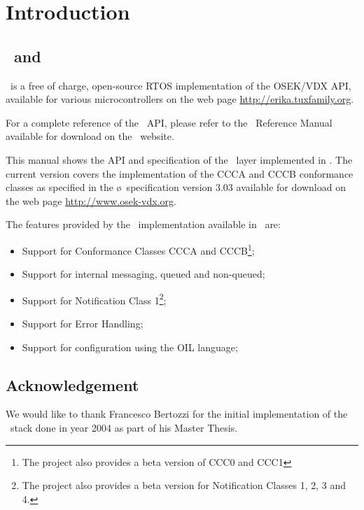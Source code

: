 \chapter{Introduction}

\section{\ee\ and \oc}

\ee\ is a free of charge, open-source RTOS implementation of the
OSEK/VDX API, available for various microcontrollers on the web page
\url{http://erika.tuxfamily.org}.

For a complete reference of the \ee\ API, please refer to the
\ee\ Reference Manual available for download on the \ee\ website.

This manual shows the API and specification of the \oc\ layer
implemented in \ee. The current version covers the
implementation of the CCCA and CCCB conformance classes as specified
in the \o\ specification version 3.03 available for download on
the web page \url{http://www.osek-vdx.org}.

The features provided by the \oc\ implementation available in \ee\ are:

\begin{itemize}
\item Support for Conformance Classes CCCA and CCCB\footnote{The project also provides a beta version of CCC0 and CCC1};
\item Support for internal messaging, queued and non-queued;
\item Support for Notification Class 1\footnote{The project also provides a beta version for Notification Classes 1, 2, 3 and 4.};
\item Support for Error Handling;
\item Support for configuration using the OIL language;
\end{itemize}


\section{Acknowledgement}
We would like to thank Francesco Bertozzi for the initial
implementation of the \oc\ stack done in year 2004 as part of his
Master Thesis.

